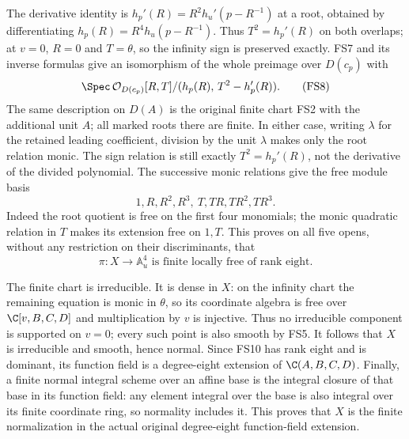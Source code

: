 The derivative identity is
$h_p'(R)=R^2h_u'(p-R^{-1})$ at a root, obtained by
differentiating $h_p(R)=R^4h_u(p-R^{-1})$.
Thus $T^2=h_p'(R)$ on both overlaps; at $v=0$, $R=0$
and $T=\theta$, so the infinity sign is preserved exactly.
FS7 and its inverse formulas give an isomorphism of the
whole preimage over $D(c_p)$ with
\begin{equation}
\Spec\,\mathcal O_{D(c_p)}[R,T]/
                 (h_p(R),\,T^2-h_p'(R)).
\tag{FS8}
\end{equation}
The same description on $D(A)$ is the original finite
chart FS2 with the additional unit $A$; all marked roots
there are finite. In either case, writing $\lambda$ for
the retained leading coefficient, division by the unit
$\lambda$ makes only the root relation monic.
The sign relation is still exactly $T^2=h_p'(R)$,
not the derivative of the divided polynomial.
The successive monic relations give the free module basis
\begin{equation}
1,R,R^2,R^3,\ T,TR,TR^2,TR^3 .
\tag{FS9}
\end{equation}
Indeed the root quotient is free on the first four monomials;
the monic quadratic relation in $T$ makes its extension
free on $1,T$. This proves on all five opens, without
any restriction on their discriminants, that
\begin{equation}
\pi:X\longrightarrow\mathbb A^4_u
\text{ is finite locally free of rank eight.}
\tag{FS10}
\end{equation}

The finite chart is irreducible. It is dense in $X$:
on the infinity chart the remaining equation is monic
in $\theta$, so its coordinate algebra is free over
$\C[v,B,C,D]$ and multiplication by $v$ is injective.
Thus no irreducible component is supported on $v=0$;
every such point is also smooth by FS5.
It follows that $X$ is irreducible and smooth, hence normal.
Since FS10 has rank eight and is dominant, its function
field is a degree-eight extension of $\C(A,B,C,D)$.
Finally, a finite normal integral scheme over an affine
base is the integral closure of that base in its function
field: any element integral over the base is also integral
over its finite coordinate ring, so normality includes it.
This proves that $X$ is the finite normalization in the
actual original degree-eight function-field extension.

